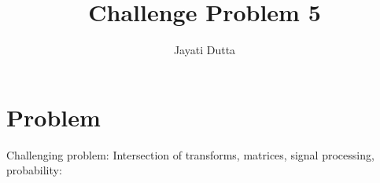 \documentclass[journal,12pt,twocolumn]{IEEEtran}
\begin{document}
\let\StandardTheFigure\thefigure
\let\vec\mathbf
\renewcommand{\thefigure}{\theproblem}



\def\putbox#1#2#3{\makebox[0in][l]{\makebox[#1][l]{}\raisebox{\baselineskip}[0in][0in]{\raisebox{#2}[0in][0in]{#3}}}}
     \def\rightbox#1{\makebox[0in][r]{#1}}
     \def\centbox#1{\makebox[0in]{#1}}
     \def\topbox#1{\raisebox{-\baselineskip}[0in][0in]{#1}}
     \def\midbox#1{\raisebox{-0.5\baselineskip}[0in][0in]{#1}}

\vspace{3cm}


\title{Challenge Problem 5}
\author{Jayati Dutta}





\maketitle

\newpage


\bigskip

\renewcommand{\thefigure}{\theenumi}
\renewcommand{\thetable}{\theenumi}



%



\section{Problem}
Challenging problem: Intersection of transforms, matrices, signal processing, probability: 
 
\end{document}
